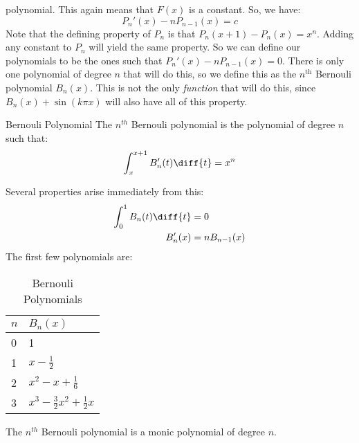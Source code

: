 \documentclass[crop=false,class=book,oneside]{standalone}
\begin{document}
            polynomial. This again means that $F(x)$ is a constant.
            So, we have:
            \begin{equation}
                P_{n}'(x)-nP_{n-1}(x)=c
            \end{equation}
            Note that the defining property of $P_{n}$ is that
            $P_{n}(x+1)-P_{n}(x)=x^{n}$. Adding any constant to
            $P_{n}$ will yield the same property. So we can define
            our polynomials to be the ones such that
            $P_{n}'(x)-nP_{n-1}(x)=0$. There is only one polynomial
            of degree $n$ that will do this, so we define this as
            the $n^{\textrm{th}}$ Bernouli polynomial $B_{n}(x)$.
            This is not the only \textit{function} that will do
            this, since $B_{n}(x)+\sin(k\pi{x})$ will also have
            all of this property.
            \begin{ldefinition}{Bernouli Polynomial}
                The $n^{th}$ Bernouli polynomial is the polynomial
                of degree $n$ such that:
                \begin{equation}
                    \int_{x}^{x+1}B_{n}'(t)\diff{t}=x^{n}
                \end{equation}
            \end{ldefinition}
            Several properties arise immediately from this:
            \begin{align}
                \int_{0}^{1}B_{n}(t)\diff{t}&=0\\
                B_{n}'(x)&=nB_{n-1}(x)
            \end{align}
            The first few polynomials are:
            \begin{table}[H]
                \captionsetup{type=table}
                \centering
                \begin{tabular}{l|l}
                    $n$&$B_{n}(x)$\\
                    \hline
                    0&1\\
                    1&$x-\frac{1}{2}$\\
                    2&$x^{2}-x+\frac{1}{6}$\\
                    3&$x^{3}-\frac{3}{2}x^{2}+\frac{1}{2}x$
                \end{tabular}
                \caption{Bernouli Polynomials}
                \label{tab:Special_Functions_BERNOULI_POLY}
            \end{table}
            \begin{theorem}
                The $n^{th}$ Bernouli polynomial
                is a monic polynomial of degree $n$.
            \end{theorem}
\end{document}
